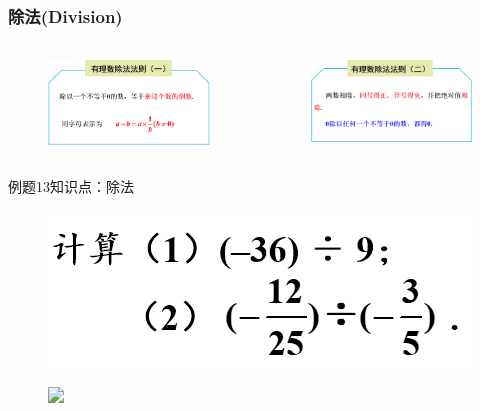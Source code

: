 \begin{frame}
    \frametitle{除法(Division)}
    \begin{columns}
        \begin{figure}
            \includegraphics[width=.99\textwidth]{assets/division1.png}
        \end{figure}
        \begin{figure}
            \includegraphics[width=.99\textwidth]{assets/division2.png}
        \end{figure}
    \end{columns}
\end{frame}

\begin{frame}{例题13}{知识点：除法}
    \begin{figure}
        \flushleft
        \includegraphics[width=.39\textwidth]{assets/div examp.png}
    \end{figure}
    \begin{figure}
        \flushleft
        \includegraphics<2>[width=.39\textwidth]{assets/div examp1.png}
    \end{figure}
\end{frame}

